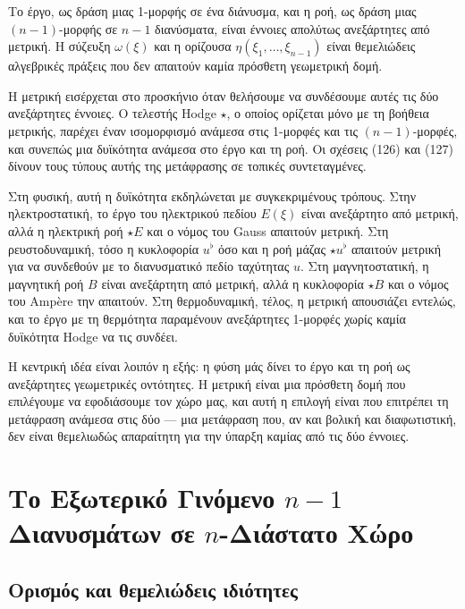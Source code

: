 \documentclass[12pt]{article}
\begin{document}
Το έργο, ως δράση μιας 1-μορφής σε ένα διάνυσμα, και η ροή, ως δράση μιας $(n-1)$-μορφής σε $n-1$ διανύσματα, είναι έννοιες απολύτως ανεξάρτητες από μετρική. Η σύζευξη $\omega(\xi)$ και η ορίζουσα $\eta(\xi_1, \dots, \xi_{n-1})$ είναι θεμελιώδεις αλγεβρικές πράξεις που δεν απαιτούν καμία πρόσθετη γεωμετρική δομή.

Η μετρική εισέρχεται στο προσκήνιο όταν θελήσουμε να συνδέσουμε αυτές τις δύο ανεξάρτητες έννοιες. Ο τελεστής Hodge $\star$, ο οποίος ορίζεται μόνο με τη βοήθεια μετρικής, παρέχει έναν ισομορφισμό ανάμεσα στις 1-μορφές και τις $(n-1)$-μορφές, και συνεπώς μια δυϊκότητα ανάμεσα στο έργο και τη ροή. Οι σχέσεις (126) και (127) δίνουν τους τύπους αυτής της μετάφρασης σε τοπικές συντεταγμένες.

Στη φυσική, αυτή η δυϊκότητα εκδηλώνεται με συγκεκριμένους τρόπους. Στην ηλεκτροστατική, το έργο του ηλεκτρικού πεδίου $E(\xi)$ είναι ανεξάρτητο από μετρική, αλλά η ηλεκτρική ροή $\star E$ και ο νόμος του Gauss απαιτούν μετρική. Στη ρευστοδυναμική, τόσο η κυκλοφορία $u^\flat$ όσο και η ροή μάζας $\star u^\flat$ απαιτούν μετρική για να συνδεθούν με το διανυσματικό πεδίο ταχύτητας $u$. Στη μαγνητοστατική, η μαγνητική ροή $B$ είναι ανεξάρτητη από μετρική, αλλά η κυκλοφορία $\star B$ και ο νόμος του Amp\`ere την απαιτούν. Στη θερμοδυναμική, τέλος, η μετρική απουσιάζει εντελώς, και το έργο με τη θερμότητα παραμένουν ανεξάρτητες 1-μορφές χωρίς καμία δυϊκότητα Hodge να τις συνδέει.

Η κεντρική ιδέα είναι λοιπόν η εξής: η φύση μάς δίνει το έργο και τη ροή ως ανεξάρτητες γεωμετρικές οντότητες. Η μετρική είναι μια πρόσθετη δομή που επιλέγουμε να εφοδιάσουμε τον χώρο μας, και αυτή η επιλογή είναι που επιτρέπει τη μετάφραση ανάμεσα στις δύο — μια μετάφραση που, αν και βολική και διαφωτιστική, δεν είναι θεμελιωδώς απαραίτητη για την ύπαρξη καμίας από τις δύο έννοιες.

\section{Το Εξωτερικό Γινόμενο $n-1$ Διανυσμάτων σε $n$-Διάστατο Χώρο}

\subsection{Ορισμός και θεμελιώδεις ιδιότητες}
\end{document}
